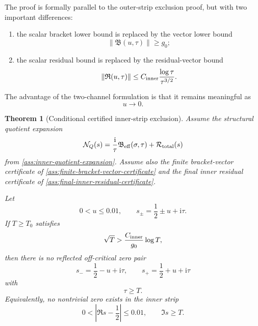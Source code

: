 \documentclass[11pt]{article}
\newtheorem{theorem}{Theorem}[section]
\newcommand{\ii}{\mathrm{i}}
\newcommand{\NQ}{\mathcal N_Q}
\newcommand{\Rtot}{\mathcal R_{\rm total}}
\newcommand{\Beff}{\mathfrak B_{\rm eff}}
\newcommand{\Bvec}{\mathfrak B}
\newcommand{\Rvec}{\mathfrak R}
\newcommand{\gev}{g_0}
\newcommand{\Cinner}{C_{\rm inner}}
\begin{document}
The proof is formally parallel to the outer-strip exclusion proof, but with two
important differences:

\begin{enumerate}[label=(\roman*)]
    \item the scalar bracket lower bound is replaced by the vector lower bound
    \[
            \|\Bvec(u,\tau)\|\ge \gev;
    \]

    \item the scalar residual bound is replaced by the residual-vector bound
    \[
            \|\Rvec(u,\tau)\|
            \le
            \Cinner
            \frac{\log\tau}{\tau^{3/2}}.
    \]
\end{enumerate}

The advantage of the two-channel formulation is that it remains meaningful as
\[
        u\to0.
\]

\begin{theorem}[Conditional certified inner-strip exclusion]
\label{thm:conditional-certified-inner-strip}
Assume the structural quotient expansion
\[
        \NQ(s)
        =
        \frac{\ii}{\tau}\Beff(\sigma,\tau)
        +
        \Rtot(s)
\]
from \cref{ass:inner-quotient-expansion}.  Assume also the finite bracket-vector
certificate of \cref{ass:finite-bracket-vector-certificate} and the final
inner residual certificate of \cref{ass:final-inner-residual-certificate}.

Let
\[
        0<u\le0.01,
        \qquad
        s_\pm=\frac12\pm u+\ii\tau.
\]
If \(T\ge T_0\) satisfies
\[
        \sqrt T
        >
        \frac{\Cinner}{\gev}
        \log T,
\]
then there is no reflected off-critical zero pair
\[
        s_-=\frac12-u+\ii\tau,
        \qquad
        s_+=\frac12+u+\ii\tau
\]
with
\[
        \tau\ge T.
\]
Equivalently, no nontrivial zero exists in the inner strip
\[
        0<\left|\Re s-\frac12\right|\le0.01,
        \qquad
        \Im s\ge T.
\]
\end{theorem}
\end{document}
